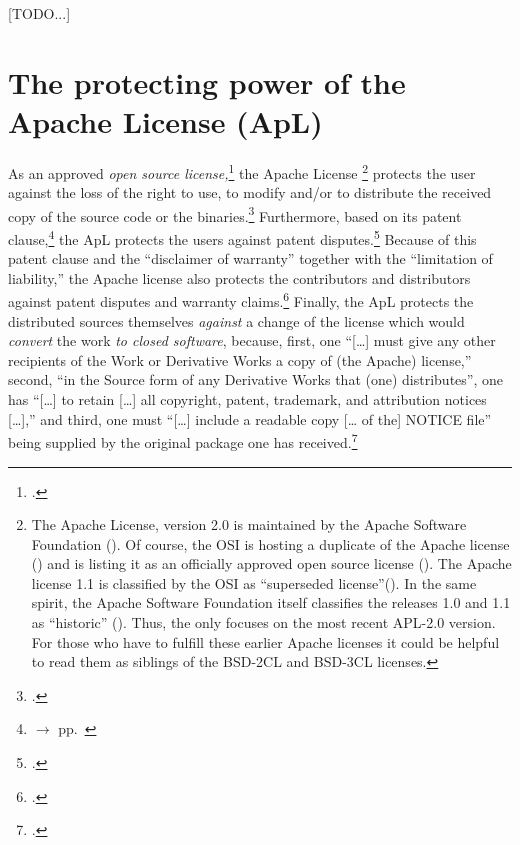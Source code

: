 [TODO...]

\section{\texorpdfstring{The protecting power of the}{The} Apache License (ApL)}

As an approved \emph{open source license,}\footcite[cf.][\nopage wp]{OSI2012b}
the Apache License%
  \footnote{The Apache License, version 2.0 is maintained by the
  Apache Software Foundation (\cite[cf.][\nopage wp]{AsfApacheLicense20a}).  Of
  course, the OSI is hosting a duplicate of the Apache license
  (\cite[cf.][\nopage wp]{Apl20OsiLicense2004a}) and is listing it as an
  officially approved open source license (\cite[cf.][\nopage wp]{OSI2012b}). The
  Apache license 1.1 is classified by the OSI as \enquote{superseded
  license}(\cite[cf.][\nopage wp]{OSI2013b}). In the same spirit, the Apache
  Software Foundation itself classifies the releases 1.0 and 1.1 as
  \enquote{historic} (\cite[cf.][\nopage wp]{AsfLicenses2013a}). Thus, the \oslic{}
  only focuses on the most recent APL-2.0 version. For those who have to fulfill
  these earlier Apache licenses it could be helpful to read them as siblings of
  the BSD-2CL and BSD-3CL licenses.}
protects the user against the loss of the
right to use, to modify and/or to distribute the received copy of the source
code or the binaries.\footcite[cf.][\nopage wp. §2]{Apl20OsiLicense2004a}
Furthermore, based on its patent clause,\footnote{$\rightarrow$ \oslic{} pp.\
} the ApL protects the users against patent
disputes.\footcite[cf.][\nopage wp. §3]{Apl20OsiLicense2004a} Because of this
patent clause and the \enquote{disclaimer of warranty} together with the
\enquote{limitation of liability,} the Apache license also protects the
contributors and distributors against patent disputes and warranty
claims.\footcite[cf.][\nopage wp. §3, §7, §8]{Apl20OsiLicense2004a} Finally, the
ApL protects the distributed sources themselves \emph{against} a change of the
license which would \emph{convert} the work \emph{to closed software}, because,
first, one \enquote{[\ldots] must give any other recipients of the Work or
Derivative Works a copy of (the Apache) license,} second, \enquote{in the Source
form of any Derivative Works that (one) distributes}, one has \enquote{[\ldots]
to retain [\ldots] all copyright, patent, trademark, and attribution notices
[\ldots],} and third, one must \enquote{[\ldots] include a readable copy [\ldots
of the] NOTICE file} being supplied by the original package one has
received.\footcite[cf.][\nopage wp. §4]{Apl20OsiLicense2004a}


